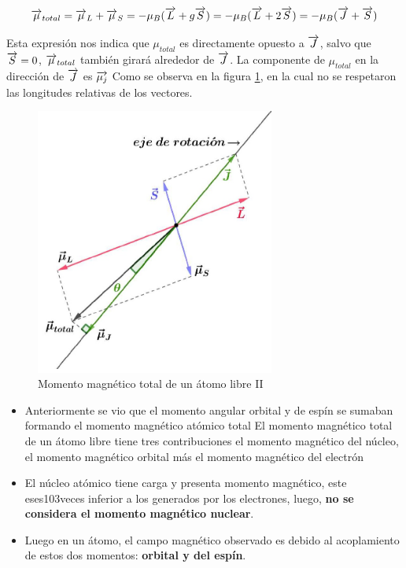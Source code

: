 \begin{sloppypar}
\begin{equation}
	\overrightarrow{\mu}_{total}=\overrightarrow{\mu}_{L}+\overrightarrow{\mu}_{S}=-\mu_{B}(\overrightarrow{L}+g\overrightarrow{S})=-\mu_{B}(\overrightarrow{L}+2\overrightarrow{S})=-\mu_{B}(\overrightarrow{J}+\overrightarrow{S})
\end{equation}

Esta expresión nos indica que $\mu_{total}$ es directamente opuesto a $\overrightarrow{J}$, salvo que ${\overrightarrow{S}=0}$, $\overrightarrow{\mu}_{total}$ también girará alrededor de $\overrightarrow{J}$. La componente de $\mu_{total}$ en la dirección de $\overrightarrow{J}$ es $\overrightarrow{\mu_{j}}$ Como se observa en la figura \ref{fig:117}, en la cual no se respetaron las longitudes relativas de los vectores.

\begin{figure}[H]
    \centering
    \includegraphics[width=0.7\textwidth]{./Figures/fig117}
	\caption{Momento magnético total de un átomo libre II}
	\label{fig:117}
 \end{figure}

\end{sloppypar}


\begin{itemize}


\item Anteriormente se vio que el momento angular orbital y de espín se sumaban formando el momento magnético atómico total El momento magnético total de un átomo libre tiene tres contribuciones el momento magnético del núcleo, el momento magnético orbital más el momento magnético del electrón

\item El núcleo atómico tiene carga y presenta momento magnético, este eses103veces inferior a los generados por los electrones, luego, \textbf{no se considera el momento magnético nuclear}.

\item Luego en un átomo, el campo magnético observado es debido al acoplamiento de estos dos momentos: \textbf{orbital y del espín}. 
\end{itemize}

